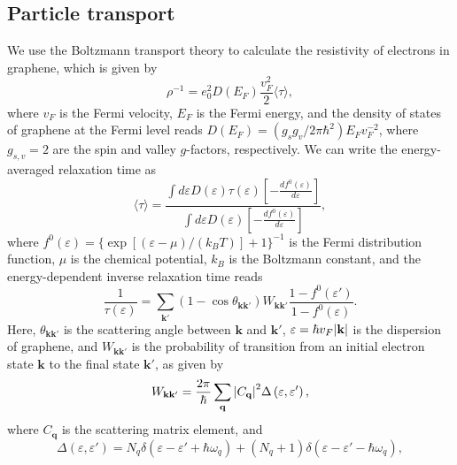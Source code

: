 \subsection{Particle transport}
We use the Boltzmann transport theory \cite{Kawamura:1990aa} to calculate the resistivity of electrons in graphene, which is given by
%
\begin{equation}\label{CH6_eq.6}
\rho^{-1} = e_0^2 D\left(E_F\right)\frac{v_F^2}{2}\langle \tau \rangle,
\end{equation}
%
where $v_F$ is the Fermi velocity, $E_F$ is the Fermi energy, and the density of states of graphene at the Fermi level reads $D\left(E_F\right) =\left(g_s g_v/2\pi \hbar^2\right)E_Fv_F^{-2}$, where $g_{s,v}=2$ are the spin and valley $g$-factors, respectively.
%
We can write the energy-averaged relaxation time as~\cite{Kawamura:1990aa,PhysRevB.45.3612,Hwang:2008aa}
%
\begin{equation}\label{CH6_eq.7}
\langle \tau \rangle = \frac{\int d \varepsilon D\left(\varepsilon \right) \tau\left( \varepsilon \right) \left[ -\frac{df^0\left(\varepsilon\right)}{d \varepsilon}\right]}{\int d \varepsilon D\left(\varepsilon\right) \left[ -\frac{df^0\left(\varepsilon\right)}{d \varepsilon} \right]},
\end{equation}
%
where $f^0\left(\varepsilon\right)=\{\exp[(\varepsilon-\mu)/(k_BT)]+1\}^{-1}$ is the Fermi distribution function, $\mu$ is the chemical potential, $k_B$ is the Boltzmann constant, and the energy-dependent inverse relaxation time reads
%
\begin{equation}\label{CH6_eq.8}
  \frac{1}{\tau\left(\varepsilon\right)} = \sum_\mathbf{k'}\left(1 -\cos\theta_\mathbf{kk'}\right) W_\mathbf{kk'} \frac{1-f^0\left(\varepsilon'\right)}{1-f^0\left(\varepsilon\right)}.
\end{equation}
%
Here, $\theta_\mathbf{kk'}$ is the scattering angle between $\mathbf{k}$ and $\mathbf{k'}$, $\varepsilon=\hbar v_F\abs{\mathbf{k}}$ is the dispersion of graphene, and $W_\mathbf{kk'}$ is the probability of transition from an initial electron state $\mathbf{k}$ to the final state $\mathbf{k}'$, as given by
%
\begin{equation}\label{CH6_eq.9}
    W_\mathbf{kk'}=\frac{2\pi}{\hbar}\sum_\mathbf{q} \abs{C_\mathbf{q}}^2 \Delta\left(\varepsilon, \varepsilon'\right),
\end{equation}
%
where $C_\mathbf{q}$ is the scattering matrix element, and
%
\begin{equation}\label{CH6_eq.10}
  \Delta\left(\varepsilon,\varepsilon'\right)=N_q\delta\left(\varepsilon-\varepsilon'+\hbar\omega_q\right)+\left(N_q+1\right)\delta\left(\varepsilon-\varepsilon'-\hbar\omega_q\right),
\end{equation}
